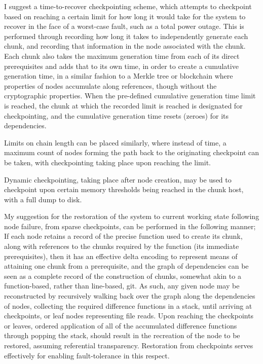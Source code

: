 I suggest a time-to-recover checkpointing scheme, which attempts to checkpoint based on reaching a certain limit for how long it would take for the system to recover in the face of a worst-case fault, such as a total power outage.
This is performed through recording how long it takes to independently generate each chunk, and recording that information in the node associated with the chunk.
Each chunk also takes the maximum generation time from each of its direct prerequisites and adds that to its own time, in order to create a cumulative generation time, in a similar fashion to a Merkle tree or blockchain where properties of nodes accumulate along references, though without the cryptographic properties\cites{merkle1988tree,nakamoto2008bitcoin}.
When the pre-defined cumulative generation time limit is reached, the chunk at which the recorded limit is reached is designated for checkpointing, and the cumulative generation time resets (zeroes) for its dependencies.

Limits on chain length can be placed similarly, where instead of time, a maximum count of nodes forming the path back to the originating checkpoint can be taken, with checkpointing taking place upon reaching the limit.

Dynamic checkpointing, taking place after node creation, may be used to checkpoint upon certain memory thresholds being reached in the chunk host, with a full dump to disk.

My suggestion for the restoration of the system to current working state following node failure, from sparse checkpoints, can be performed in the following manner; If each node retains a record of the precise function used to create its chunk, along with references to the chunks required by the function (its immediate prerequisites), then it has an effective delta encoding to represent means of attaining one chunk from a prerequisite, and the graph of dependencies can be seen as a complete record of the construction of chunks, somewhat akin to a function-based, rather than line-based, git\cite{chacon2014progit}.
As such, any given node may be reconstructed by recursively walking back over the graph along the dependencies of nodes, collecting the required difference functions in a stack, until arriving at checkpoints, or leaf nodes representing file reads.
Upon reaching the checkpoints or leaves, ordered application of all of the accumulated difference functions through popping the stack, should result in the recreation of the node to be restored, assuming referential transparency.
Restoration from checkpoints serves effectively for enabling fault-tolerance in this respect.

